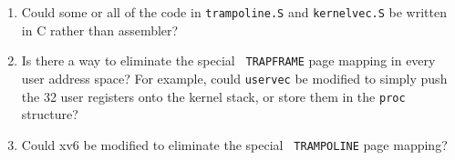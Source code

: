 \begin{enumerate}

\item Could some or all of the code in {\tt trampoline.S} and
{\tt kernelvec.S} be written in C rather than assembler?

\item Is there a way to eliminate the special {\tt
  TRAPFRAME} page mapping in every user address space? For
  example, could
  {\tt uservec} be modified to simply push the 32 user registers
  onto the kernel stack, or store them in the {\tt proc}
  structure?

\item Could xv6 be modified to eliminate the special {\tt
  TRAMPOLINE} page mapping?

\end{enumerate}
